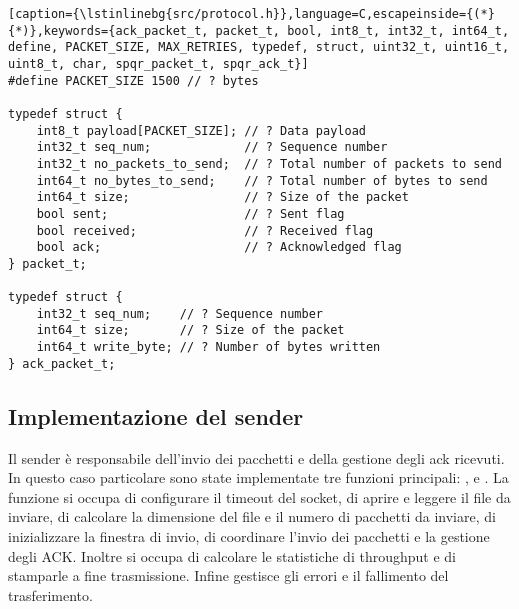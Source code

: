 \begin{lstlisting}[caption={\lstinlinebg{src/protocol.h}},language=C,escapeinside={(*}{*)},keywords={ack_packet_t, packet_t, bool, int8_t, int32_t, int64_t, define, PACKET_SIZE, MAX_RETRIES, typedef, struct, uint32_t, uint16_t, uint8_t, char, spqr_packet_t, spqr_ack_t}]
#define PACKET_SIZE 1500 // ? bytes

typedef struct {
    int8_t payload[PACKET_SIZE]; // ? Data payload
    int32_t seq_num;             // ? Sequence number
    int32_t no_packets_to_send;  // ? Total number of packets to send
    int64_t no_bytes_to_send;    // ? Total number of bytes to send
    int64_t size;                // ? Size of the packet
    bool sent;                   // ? Sent flag
    bool received;               // ? Received flag
    bool ack;                    // ? Acknowledged flag
} packet_t;

typedef struct {
    int32_t seq_num;    // ? Sequence number
    int64_t size;       // ? Size of the packet
    int64_t write_byte; // ? Number of bytes written
} ack_packet_t;
\end{lstlisting}

\subsection{Implementazione del sender}
Il sender è responsabile dell'invio dei pacchetti e della gestione degli ack ricevuti.
In questo caso particolare sono state implementate tre funzioni principali: ,  e .
La funzione  si occupa di configurare il timeout del socket, di aprire e leggere il file da inviare, di calcolare la dimensione del file e il numero di pacchetti da inviare, di inizializzare la finestra di invio, di coordinare l'invio dei pacchetti e la gestione degli ACK.
Inoltre si occupa di calcolare le statistiche di throughput e di stamparle a fine trasmissione.
Infine gestisce gli errori e il fallimento del trasferimento.


